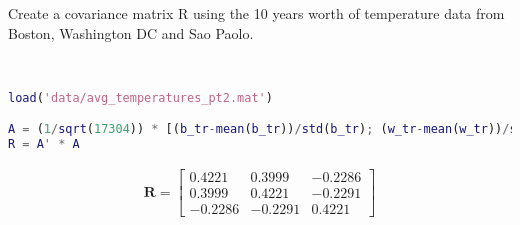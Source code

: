 Create a covariance matrix R using the 10 years worth of temperature data from Boston, Washington DC and Sao Paolo.

\begin{solution} \
    \begin{lstlisting}[language=Matlab]
load('data/avg_temperatures_pt2.mat')

A = (1/sqrt(17304)) * [(b_tr-mean(b_tr))/std(b_tr); (w_tr-mean(w_tr))/std(w_tr) (s_tr-mean(s_tr))/std(s_tr)]
R = A' * A
    \end{lstlisting}
    
    \begin{align*}
        \boldsymbol{R} = \begin{bmatrix}
            0.4221 &  0.3999 & -0.2286 \\
            0.3999 &  0.4221 & -0.2291 \\
           -0.2286 & -0.2291 &  0.4221
        \end{bmatrix}
    \end{align*}
\end{solution}